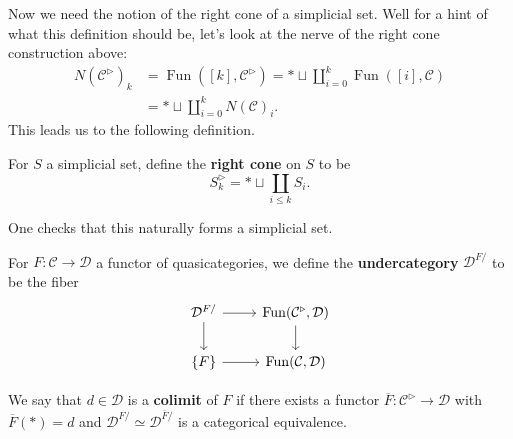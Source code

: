 \documentclass{amsart}
\DeclareMathOperator{\Fun}{Fun}
\begin{document}
Now we need the notion of the right cone of a simplicial set. Well for a hint
of what this definition should be, let's look at the nerve of the right cone construction
above:
\begin{align*}
    N(\mathcal{C}^\triangleright)_k &= \Fun([k],\mathcal{C}^\triangleright) = *\sqcup \coprod_{i=0}^k\Fun([i],\mathcal{C}) \\
    &= *\sqcup \coprod_{i=0}^k N(\mathcal{C})_i.
\end{align*}
This leads us to the following definition.
\begin{definition}
    For $S$ a simplicial set, define the \textbf{right cone} on $S$ to be
    \begin{equation*}
        S^\triangleright_k =* \sqcup  \coprod_{i\leqslant k}S_i.
    \end{equation*}
\end{definition}
One checks that this naturally forms a simplicial set.

\begin{definition}
    For $F:\mathcal{C}\to \mathcal{D}$ a functor of quasicategories, we define
    the \textbf{undercategory} $\mathcal{D}^{F/}$ to be the fiber
    \begin{equation*}
        \begin{tikzcd}
            \mathcal{D}^{F/} \rar\dar & \Fun(\mathcal{C}^\triangleright,\mathcal{D})\dar\\
            \{F\} \rar & \Fun(\mathcal{C},\mathcal{D})
        \end{tikzcd}
    \end{equation*}
\end{definition}

\begin{definition}
    We say that $d\in \mathcal{D}$ is a \textbf{colimit} of $F$ if there exists a functor
    $\overline F:\mathcal{C}^\triangleright\to \mathcal{D}$ with $\overline F(*)=d$ and
    $\mathcal{D}^{F/}\simeq \mathcal{D}^{\overline F/}$ is a categorical equivalence.
\end{definition}
\end{document}

